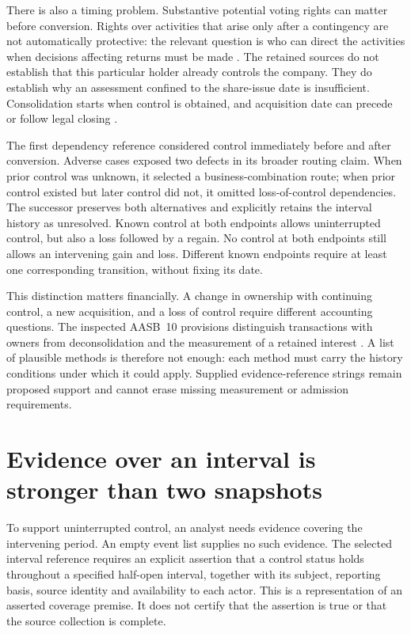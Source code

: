 There is also a timing problem. Substantive potential voting rights can matter
before conversion. Rights over activities that arise only after a contingency
are not automatically protective: the relevant question is who can direct
the activities when decisions affecting returns must be made
\citep[paragraphs B22--B28 and B47--B53]{aasb10scope2026}. The retained sources
do not establish that this particular holder already controls the company.
They do establish why an assessment confined to the share-issue date is
insufficient. Consolidation starts when control is obtained, and acquisition
date can precede or follow legal closing
\citep[paragraph20]{aasb10scope2026}\citep[paragraphs8--9]{aasb3scope2026}.

The first dependency reference considered control immediately before and after
conversion. Adverse cases exposed two defects in its broader routing claim.
When prior control was unknown, it selected a business-combination route;
when prior control existed but later control did not, it omitted loss-of-control
dependencies. The successor preserves both alternatives and explicitly retains
the interval history as unresolved. Known control at both endpoints allows
uninterrupted control, but also a loss followed by a regain. No control at both
endpoints still allows an intervening gain and loss. Different known endpoints
require at least one corresponding transition, without fixing its date.

This distinction matters financially. A change in ownership with continuing
control, a new acquisition, and a loss of control require different accounting
questions. The inspected AASB~10 provisions distinguish transactions with owners
from deconsolidation and the measurement of a retained interest
\citep[paragraphs23--25, B96 and B98--B99]{aasb10scope2026}. A list of plausible
methods is therefore not enough: each method must carry the history conditions
under which it could apply. Supplied evidence-reference strings remain proposed
support and cannot erase missing measurement or admission requirements.

\section{Evidence over an interval is stronger than two snapshots}
\label{sim:control-interval-evidence}
To support uninterrupted control, an analyst needs evidence covering the
intervening period. An empty event list supplies no such evidence. The selected
interval reference requires an explicit assertion that a control status holds
throughout a specified half-open interval, together with its subject, reporting
basis, source identity and availability to each actor. This is a representation
of an asserted coverage premise. It does not certify that the assertion is true
or that the source collection is complete.

